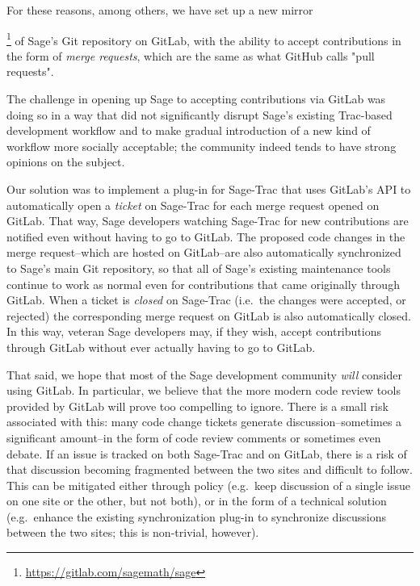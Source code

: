 For these reasons, among others, we have set up a new
mirror{\footnote{\url{https://gitlab.com/sagemath/sage}} of Sage's Git
repository on GitLab, with the ability to accept contributions in the form of
{\em merge requests}, which are the same as what GitHub calls "pull requests".

The challenge in opening up Sage to accepting contributions via GitLab was
doing so in a way that did not significantly disrupt Sage's existing Trac-based
development workflow and to make gradual introduction of a new kind of workflow
more socially acceptable; the community indeed tends to have strong opinions on
the subject.

Our solution was to implement a plug-in for Sage-Trac that uses GitLab's API to
automatically open a {\em ticket} on Sage-Trac for each merge request opened on
GitLab.  That way, Sage developers watching Sage-Trac for new contributions are
notified even without having to go to GitLab.  The proposed code changes in the
merge request--which are hosted on GitLab--are also automatically synchronized
to Sage's main Git repository, so that all of Sage's existing maintenance tools
continue to work as normal even for contributions that came originally through
GitLab.  When a ticket is {\em closed} on Sage-Trac (i.e.~the changes were
accepted, or rejected) the corresponding merge request on GitLab is also
automatically closed.  In this way, veteran Sage developers may, if they wish,
accept contributions through GitLab without ever actually having to go to
GitLab.

That said, we hope that most of the Sage development community {\em will}
consider using GitLab.  In particular, we believe that the more modern code
review tools provided by GitLab will prove too compelling to ignore.  There
is a small risk associated with this: many code change tickets generate
discussion--sometimes a significant amount--in the form of code review comments
or sometimes even debate.  If an issue is tracked on both Sage-Trac and on
GitLab, there is a risk of that discussion becoming fragmented between the two
sites and difficult to follow.  This can be mitigated either through policy
(e.g.~keep discussion of a single issue on one site or the other, but not
both), or in the form of a technical solution (e.g.~enhance the existing
synchronization plug-in to synchronize discussions between the two sites; this
is non-trivial, however).


}
